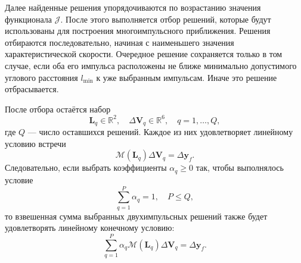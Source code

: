 Далее найденные решения упорядочиваются по возрастанию значения функционала $\mathcal{J}$. После этого выполняется отбор решений, которые будут использованы для построения многоимпульсного приближения. Решения отбираются последовательно, начиная с наименьшего значения характеристической скорости. Очередное решение сохраняется только в том случае, если оба его импульса расположены не ближе минимально допустимого углового расстояния $l_{\text{min}}$ к уже выбранным импульсам. Иначе это решение отбрасывается.

После отбора остаётся набор
\begin{equation}
    \mathbf{L}_q \in \mathbb{R}^{2}, \quad
    \Delta \mathbf{V}_q \in \mathbb{R}^{6}, \quad
    q = 1, \dots, Q,
\end{equation}
где $Q$ --- число оставшихся решений. Каждое из них удовлетворяет линейному условию встречи
\begin{equation}
    \mathcal{M} (\mathbf{L}_q) \Delta \mathbf{V}_q = \Delta \mathbf{y}_f.
\end{equation}
Следовательно, если выбрать коэффициенты $\alpha_q \geq 0$ так, чтобы выполнялось условие
\begin{equation}
    \sum_{q=1}^{P} \alpha_q = 1, \quad 
    P \leq Q,
\label{sum_alpha_1_eq_1}
\end{equation}
то взвешенная сумма выбранных двухимпульсных решений также будет удовлетворять линейному конечному условию:
\begin{equation}
    \sum_{q=1}^P \alpha_q \mathcal{M} (\mathbf{L}_q) \Delta \mathbf{V}_q = \Delta \mathbf{y}_f.
\end{equation}

